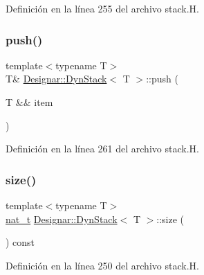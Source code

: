 Definición en la línea 255 del archivo stack.\+H.

\mbox{\label{class_designar_1_1_dyn_stack_a1eff6c891fd3800c6aa55f35e14e4f88}} 
\subsubsection{\texorpdfstring{push()}{push()}\hspace{0.1cm}{\footnotesize\ttfamily [2/2]}}
{\footnotesize\ttfamily template$<$typename T$>$ \\
T\& \hyperlink{class_designar_1_1_dyn_stack}{Designar\+::\+Dyn\+Stack}$<$ T $>$\+::push (\begin{DoxyParamCaption}\item[{T \&\&}]{item }\end{DoxyParamCaption})\hspace{0.3cm}{\ttfamily [inline]}}



Definición en la línea 261 del archivo stack.\+H.

\mbox{\label{class_designar_1_1_dyn_stack_a4c15622a5283c072287a7dfdd6c4bd2d}} 
\subsubsection{\texorpdfstring{size()}{size()}}
{\footnotesize\ttfamily template$<$typename T$>$ \\
\hyperlink{namespace_designar_aa72662848b9f4815e7bf31a7cf3e33d1}{nat\+\_\+t} \hyperlink{class_designar_1_1_dyn_stack}{Designar\+::\+Dyn\+Stack}$<$ T $>$\+::size (\begin{DoxyParamCaption}{ }\end{DoxyParamCaption}) const\hspace{0.3cm}{\ttfamily [inline]}}



Definición en la línea 250 del archivo stack.\+H.

\mbox{\label{class_designar_1_1_dyn_stack_a33e8c623bae518ed88cdee01602febb0}} 
